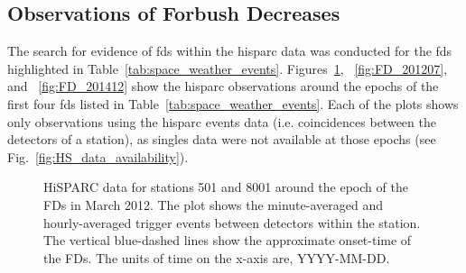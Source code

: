 \subsection{Observations of Forbush Decreases}


The search for evidence of \glspl{fd} within the \gls{hisparc} data was conducted for the \glspl{fd} highlighted in Table~\ref{tab:space_weather_events}. Figures~\ref{fig:FD_201203}, ~\ref{fig:FD_201207}, and ~\ref{fig:FD_201412} show the \gls{hisparc} observations around the epochs of the first four \glspl{fd} listed in Table~\ref{tab:space_weather_events}. Each of the plots shows only observations using the \gls{hisparc} events data (i.e. coincidences between the detectors of a station), as singles data were not available at those epochs (see Fig.~\ref{fig:HS_data_availability}).

\begin{figure}[ht]
	\centering
	
	\caption{HiSPARC data for stations 501 and 8001 around the epoch of the FDs in March 2012. The plot shows the minute-averaged and hourly-averaged trigger events between detectors within the station. The vertical blue-dashed lines show the approximate onset-time of the FDs. The units of time on the x-axis are, YYYY-MM-DD.}
	\label{fig:FD_201203}
\end{figure}

